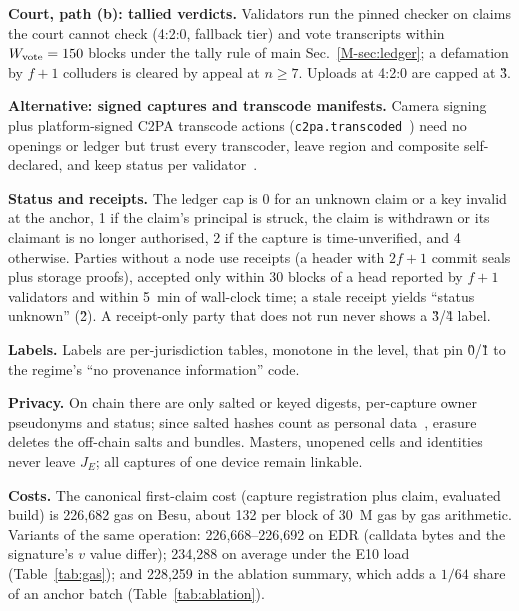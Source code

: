 \documentclass[10pt]{article}
\newcommand{\mainref}[1]{\ref{M-#1}}
\begin{document}
\textbf{Court, path (b): tallied verdicts.} Validators run the pinned checker on claims the court cannot check (4:2:0,
fallback tier) and vote transcripts within $W_{\mathrm{vote}}=150$ blocks under the tally rule of main
Sec.~\mainref{sec:ledger}; a defamation by $f+1$ colluders is cleared by appeal at $n\ge7$. Uploads at 4:2:0 are capped
at \G{3}.

\textbf{Alternative: signed captures and transcode manifests.} Camera signing~\cite{gosb2025pixel} plus platform-signed
C2PA transcode actions (\texttt{c2pa.transcoded}~\cite{cfcpaa2026content}) need no openings or ledger but trust every transcoder,
leave region and composite self-declared, and keep status per validator~\cite{golaszewski2026verifying}.

\textbf{Status and receipts.} The ledger cap is 0 for an unknown claim or a key invalid at the anchor, 1 if the claim's
principal is struck, the claim is withdrawn or its claimant is no longer authorised, 2 if the capture is
time-unverified, and 4 otherwise. Parties without a node use receipts (a header with $2f+1$ commit seals plus storage
proofs), accepted only within 30 blocks of a head reported by $f+1$ validators and within 5~min of wall-clock time;
a stale receipt yields ``status unknown'' (\G{2}). A receipt-only party that does not run \VerifyE{} never shows a
\G{3}/\G{4} label.

\textbf{Labels.} Labels are per-jurisdiction tables, monotone in the level, that pin \G{0}/\G{1} to the regime's ``no
provenance information'' code.

\textbf{Privacy.} On chain there are only salted or keyed digests, per-capture owner pseudonyms and status; since salted
hashes count as personal data~\cite{edpb2026blockchain}, erasure deletes the off-chain salts and bundles. Masters,
unopened cells and identities never leave $J_E$; all captures of one device remain linkable.

\textbf{Costs.} The canonical first-claim cost (capture registration plus claim, evaluated build) is 226,682 gas on Besu,
about 132 per block of 30~M gas by gas arithmetic. Variants of the same operation: 226,668--226,692 on EDR (calldata bytes
and the signature's $v$ value differ); 234,288 on average under the E10 load (Table~\ref{tab:gas}); and 228,259 in the
ablation summary, which adds a $1/64$ share of an anchor batch (Table~\ref{tab:ablation}).
\end{document}
